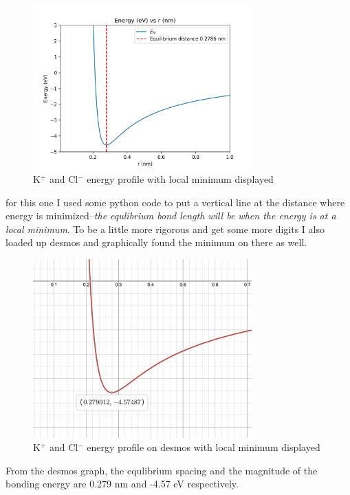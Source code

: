\documentclass{article}
\begin{document}
\begin{figure}[h]
    \centering
    \includegraphics[trim=0cm 0cm 0cm 0cm, clip, width=0.75\textwidth]{2b.png}
    \caption{K$^+$ and Cl$^-$ energy profile with local minimum displayed}
\end{figure}

for this one I used some python code to put a vertical line at the distance where energy is minimized--\textit{the equlibrium bond length will be when the energy is at a local minimum}. To be a little more rigorous and get some more digits I also loaded up desmos and graphically found the minimum on there as well.

\begin{figure}[H]
    \centering
    \includegraphics[trim=0cm 0cm 0cm 0cm, clip, width=0.75\textwidth]{2b_desmos.png}
    \caption{K$^+$ and Cl$^-$ energy profile on desmos with local minimum displayed}
\end{figure}


From the desmos graph, the equlibrium spacing and the magnitude of the bonding energy are 0.279 nm and -4.57 eV respectively.
\end{document}
